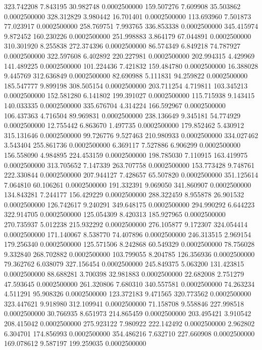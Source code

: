 323.742208 7.843195 30.982748 0.0002500000
159.507276 7.609908 35.503862 0.0002500000
328.312829 3.980442 16.701401 0.0002500000
113.693960 7.501873 77.023917 0.0002500000
258.769751 7.993765 336.853338 0.0002500000
345.415974 9.872452 160.230226 0.0002500000
251.998883 3.864179 67.044891 0.0002500000
310.301920 8.255838 272.374396 0.0002500000
86.574349 6.849218 74.787927 0.0002500000
322.597608 6.402892 220.227981 0.0002500000
202.994315 4.429969 141.489225 0.0002500000
101.224436 7.421832 159.484780 0.0002500000
16.388028 9.445769 312.636849 0.0002500000
82.690988 5.111831 94.259822 0.0002500000
185.547777 9.899198 308.505154 0.0002500000
203.711254 4.719811 103.345213 0.0002500000
152.581280 6.141802 199.391027 0.0002500000
115.715938 9.143415 140.033335 0.0002500000
335.676704 4.314224 166.592967 0.0002500000
106.437363 4.716504 89.969831 0.0002500000
238.136649 9.345181 54.774929 0.0002500000
12.755442 6.863670 1.497735 0.0002500000
179.852462 5.430912 315.131646 0.0002500000
99.726776 9.527463 210.980933 0.0002500000
334.027462 3.543404 255.861736 0.0002500000
6.369117 7.527886 6.906299 0.0002500000
156.558090 4.984895 224.453159 0.0002500000
198.785030 7.110915 163.419975 0.0002500000
313.705652 7.147339 263.707758 0.0002500000
153.773428 9.748761 222.330844 0.0002500000
207.944127 7.428657 65.507820 0.0002500000
351.125614 7.064810 60.106261 0.0002500000
191.332391 9.069050 341.860907 0.0002500000
134.843281 7.244177 156.429229 0.0002500000
288.322459 8.955878 26.901532 0.0002500000
126.742617 9.240291 349.648175 0.0002500000
294.990292 6.644223 322.914705 0.0002500000
125.054309 8.420313 185.927965 0.0002500000
270.735937 5.012238 215.932292 0.0002500000
276.105877 9.172307 324.054414 0.0002500000
171.140067 8.538770 74.407896 0.0002500000
246.313515 2.969154 179.256340 0.0002500000
125.571506 8.242868 60.549329 0.0002500000
78.756028 9.332840 268.702882 0.0002500000
103.799055 8.204785 126.356936 0.0002500000
79.362762 6.038079 327.156454 0.0002500000
245.849375 5.063200 131.423815 0.0002500000
88.688281 3.700398 32.981883 0.0002500000
22.682008 2.751279 47.593645 0.0002500000
261.320806 7.680310 340.557581 0.0002500000
74.263234 4.511291 95.908326 0.0002500000
123.372183 9.471565 320.773562 0.0002500000
323.447621 9.918980 312.109941 0.0002500000
71.158708 9.558846 227.998518 0.0002500000
30.766935 8.651973 214.865459 0.0002500000
203.495421 3.910542 208.415042 0.0002500000
275.923122 7.980922 222.142492 0.0002500000
2.962802 6.304701 174.856993 0.0002500000
354.486216 7.632710 227.660908 0.0002500000
169.078612 9.587197 199.259035 0.0002500000
